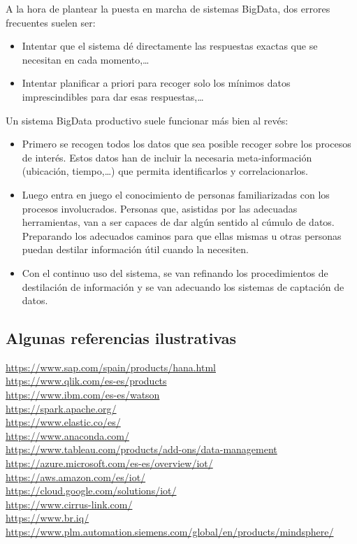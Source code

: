 \documentclass[spanish,12pt,a4paper,final,oneside]{book}
\begin{document}
\vspace{0.5cm}
A la hora de plantear la puesta en marcha de sistemas BigData, dos errores frecuentes suelen ser: 
\begin{itemize}
\item Intentar que el sistema dé directamente las respuestas exactas que se necesitan en cada momento,\ldots 
\item Intentar planificar a priori para recoger solo los mínimos datos imprescindibles para dar esas respuestas,\ldots 
\end{itemize}
Un sistema BigData productivo suele funcionar más bien al revés:
\begin{itemize}
\item Primero se recogen todos los datos que sea posible recoger sobre los procesos de interés. Estos datos han de incluir la necesaria meta-información (ubicación, tiempo,\ldots) que permita identificarlos y correlacionarlos.
\item Luego entra en juego el conocimiento de personas familiarizadas con los procesos involucrados. Personas que, asistidas por las adecuadas herramientas, van a ser capaces de dar algún sentido al cúmulo de datos. Preparando los adecuados caminos para que ellas mismas u otras personas puedan destilar información útil cuando la necesiten.
\item Con el continuo uso del sistema, se van refinando los procedimientos de destilación de información y se van adecuando los sistemas de captación de datos.
\end{itemize}

\subsection*{Algunas referencias ilustrativas}
\url{https://www.sap.com/spain/products/hana.html}
\\ \url{https://www.qlik.com/es-es/products}
\\ \url{https://www.ibm.com/es-es/watson}
\\ \url{https://spark.apache.org/}
\\ \url{https://www.elastic.co/es/}
\\ \url{https://www.anaconda.com/}
\\ \url{https://www.tableau.com/products/add-ons/data-management}
\\ \url{https://azure.microsoft.com/es-es/overview/iot/}
\\ \url{https://aws.amazon.com/es/iot/}
\\ \url{https://cloud.google.com/solutions/iot/}
\\ \url{https://www.cirrus-link.com/}
\\ \url{https://www.br.iq/}
\\ \url{https://www.plm.automation.siemens.com/global/en/products/mindsphere/}
\end{document}
